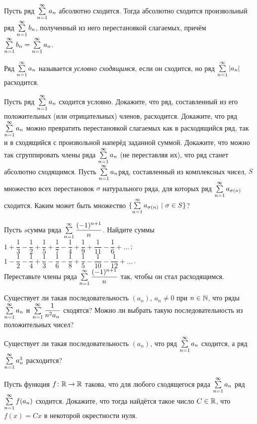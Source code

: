 \documentclass[a4paper,12pt]{article}
\begin{document}
Пусть ряд $\sum\limits_{n=1}^{\infty} a_n$ абсолютно сходится. Тогда абсолютно сходится произвольный ряд $\sum\limits_{n=1}^{\infty} b_n$, полученный из него перестановкой слагаемых, причём $\sum\limits_{n=1}^{\infty} b_n=\sum\limits_{n=1}^{\infty} a_n$.


\newpage

Ряд $\sum\limits_{n=1}^{\infty} a_n$ называется \emph{условно сходящимся}, если он сходится, но ряд $\sum\limits_{n=1}^{\infty}|a_n|$ расходится.

Пусть ряд $\sum\limits_{n=1}^{\infty} a_n$ сходится условно.
Докажите, что ряд, составленный из его положительных (или отрицательных) членов, расходится.
Докажите, что ряд $\sum\limits_{n=1}^{\infty} a_n$ можно превратить перестановкой слагаемых как в расходящийся ряд, так и в сходящийся с произвольной наперёд заданной суммой.
Докажите, что можно так сгруппировать члены ряда $\sum\limits_{n=1}^{\infty} a_n$ (не переставляя их), что ряд станет абсолютно сходящимся.
Пусть $\sum\limits_{n=1}^{\infty} a_n$\т ряд, составленный из комплексных чисел, $S$\т множество всех перестановок $\sigma$ натурального ряда, для которых ряд $\sum\limits_{n=1}^{\infty} a_{\sigma(n)}$ сходится. Каким может быть множество $\{\sum\limits_{n=1}^{\infty} a_{\sigma(n)}\ |\ \sigma\in S\}$?



Пусть $s$\т сумма ряда $\sum\limits_{n=1}^{\infty} \dfrac{(-1)^{n+1}}{n}$. Найдите суммы\medskip\\
$1+\dfrac13-\dfrac12+\dfrac15+\dfrac17-\dfrac14+\dfrac19+\dfrac1{11}-\dfrac16+\ldots$\,;
$1-\dfrac12-\dfrac14+\dfrac13-\dfrac16-\dfrac18+\dfrac15-\dfrac1{10}-\dfrac1{12}+\ldots$\,.\medskip\\
Переставьте члены ряда $\sum\limits_{n=1}^{\infty} \dfrac{(-1)^{n+1}}{n}$ так, чтобы он стал расходящимся.


Существует ли такая последовательность $(a_n)$, $a_n\ne0$ при $n\in\mathbb{N}$, что ряды $\sum\limits_{n=1}^{\infty} a_n$ и $\sum\limits_{n=1}^{\infty} \dfrac1{n^2a_n}$ сходятся? Можно ли выбрать такую последовательность из положительных чисел?


Существует ли такая последовательность $(a_n)$, что ряд $\sum\limits_{n=1}^{\infty} a_n$ сходится, а ряд $\sum\limits_{n=1}^{\infty} a_n^3$ расходится?


Пусть функция $f\colon\mathbb{R}\rightarrow\mathbb{R}$ такова, что для любого сходящегося ряда $\sum\limits_{n=1}^{\infty} a_n$ ряд $\sum\limits_{n=1}^{\infty} f(a_n)$ сходится. Докажите, что тогда найдётся такое число $C\in\mathbb{R}$, что $f(x) = Cx$ в некоторой окрестности нуля.


{}
\end{document}
